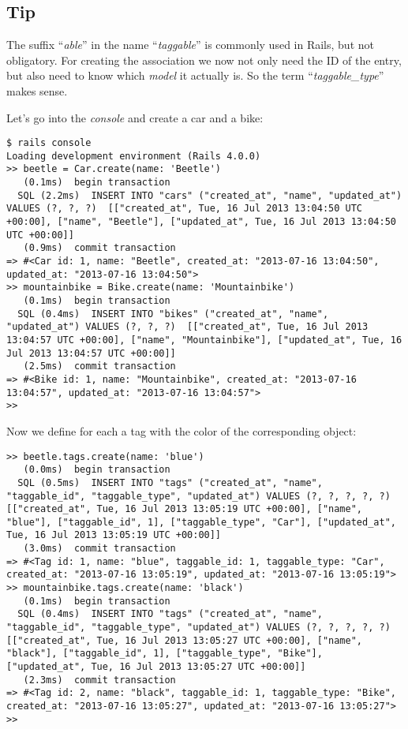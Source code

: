\documentclass[a4paper]{book}
\begin{document}
\subsection{Tip}\label{tip-9}

The suffix “\emph{able}” in the name “\emph{taggable}” is commonly used in Rails, but not obligatory. For creating the association we now not only need the ID of the entry, but also need to know which \emph{model} it actually is. So the term “\emph{taggable\_type}” makes sense.

Let's go into the \emph{console} and create a car and a bike:

\begin{shaded}\begin{verbatim}
$ rails console
Loading development environment (Rails 4.0.0)
>> beetle = Car.create(name: 'Beetle')
   (0.1ms)  begin transaction
  SQL (2.2ms)  INSERT INTO "cars" ("created_at", "name", "updated_at") VALUES (?, ?, ?)  [["created_at", Tue, 16 Jul 2013 13:04:50 UTC +00:00], ["name", "Beetle"], ["updated_at", Tue, 16 Jul 2013 13:04:50 UTC +00:00]]
   (0.9ms)  commit transaction
=> #<Car id: 1, name: "Beetle", created_at: "2013-07-16 13:04:50", updated_at: "2013-07-16 13:04:50">
>> mountainbike = Bike.create(name: 'Mountainbike')
   (0.1ms)  begin transaction
  SQL (0.4ms)  INSERT INTO "bikes" ("created_at", "name", "updated_at") VALUES (?, ?, ?)  [["created_at", Tue, 16 Jul 2013 13:04:57 UTC +00:00], ["name", "Mountainbike"], ["updated_at", Tue, 16 Jul 2013 13:04:57 UTC +00:00]]
   (2.5ms)  commit transaction
=> #<Bike id: 1, name: "Mountainbike", created_at: "2013-07-16 13:04:57", updated_at: "2013-07-16 13:04:57">
>>
\end{verbatim}\end{shaded}

Now we define for each a tag with the color of the corresponding object:

\begin{shaded}\begin{verbatim}
>> beetle.tags.create(name: 'blue')
   (0.0ms)  begin transaction
  SQL (0.5ms)  INSERT INTO "tags" ("created_at", "name", "taggable_id", "taggable_type", "updated_at") VALUES (?, ?, ?, ?, ?)  [["created_at", Tue, 16 Jul 2013 13:05:19 UTC +00:00], ["name", "blue"], ["taggable_id", 1], ["taggable_type", "Car"], ["updated_at", Tue, 16 Jul 2013 13:05:19 UTC +00:00]]
   (3.0ms)  commit transaction
=> #<Tag id: 1, name: "blue", taggable_id: 1, taggable_type: "Car", created_at: "2013-07-16 13:05:19", updated_at: "2013-07-16 13:05:19">
>> mountainbike.tags.create(name: 'black')
   (0.1ms)  begin transaction
  SQL (0.4ms)  INSERT INTO "tags" ("created_at", "name", "taggable_id", "taggable_type", "updated_at") VALUES (?, ?, ?, ?, ?)  [["created_at", Tue, 16 Jul 2013 13:05:27 UTC +00:00], ["name", "black"], ["taggable_id", 1], ["taggable_type", "Bike"], ["updated_at", Tue, 16 Jul 2013 13:05:27 UTC +00:00]]
   (2.3ms)  commit transaction
=> #<Tag id: 2, name: "black", taggable_id: 1, taggable_type: "Bike", created_at: "2013-07-16 13:05:27", updated_at: "2013-07-16 13:05:27">
>>
\end{verbatim}\end{shaded}
\end{document}
